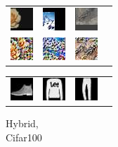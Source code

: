 \begin{figure}[h]
\begin{subtable}{.25\linewidth}
\end{subtable}%
\hfill
\begin{subtable}{.25\linewidth}\centering
{\begin{tabular}{ l l l l }
  \includegraphics[width = 24pt]{repimages/ori_21_hybrid.jpg} &  \includegraphics[width = 24pt]{repimages/ori_22_hybrid.jpg}  & \includegraphics[width = 24pt]{repimages/ori_98_hybrid.jpg} \\
  \includegraphics[width = 24pt]{repimages/rec_21_hybrid.jpg} &  \includegraphics[width = 24pt]{repimages/rec_22_hybrid.jpg}  &  \includegraphics[width = 24pt]{repimages/rec_98_hybrid.jpg}  &   \\
\end{tabular}}
\caption{Hybrid, \\ Cifar100}%
\end{subtable}%
\hfill
\begin{subtable}{.25\linewidth}\centering
{\begin{tabular}{ l l l l }
  \includegraphics[width = 24pt]{repimages_fmnist/ori_1_unaug.jpg} &  \includegraphics[width = 24pt]{repimages_fmnist/ori_2_unaug.jpg}  & \includegraphics[width = 24pt]{repimages_fmnist/ori_3_unaug.jpg} \\

\end{tabular}}
\end{subtable}
\end{figure}
